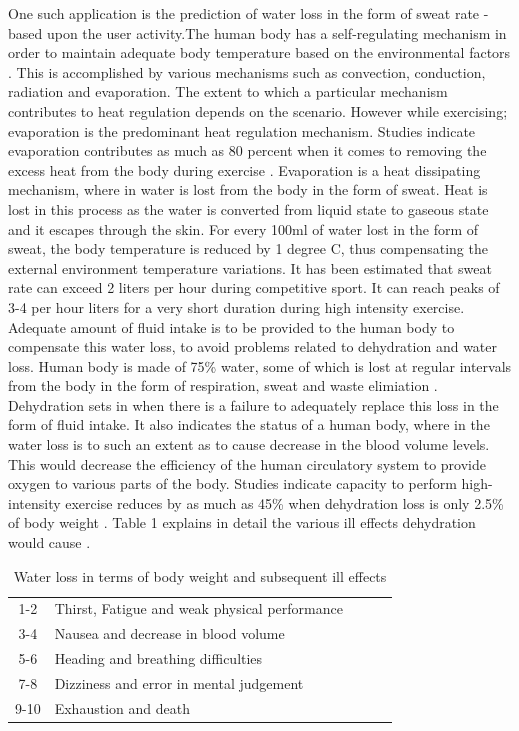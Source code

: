 \documentclass[conference]{IEEEtran}
\begin{document}
One such application is the prediction of water loss in the form of sweat rate - based upon the user activity.The human body has a self-regulating mechanism in order to maintain adequate body temperature based on the environmental factors \cite{ref8} . This is accomplished by various mechanisms such as convection, conduction, radiation and evaporation. The extent to which a particular mechanism contributes to heat regulation depends on the scenario. However while exercising; evaporation is the predominant heat regulation mechanism. Studies indicate evaporation contributes as much as 80 percent when it comes to removing the excess heat from the body during exercise \cite{ref8}. Evaporation is a heat dissipating mechanism, where in water is lost from the body in the form of sweat. Heat is lost in this process as the water is converted from liquid state to gaseous state and it escapes through the skin. For every 100ml of water lost in the form of sweat, the body temperature is reduced by 1 degree C, thus compensating the external environment temperature variations. It has been estimated that sweat rate can exceed 2 liters per hour during competitive sport. It can reach peaks of 3-4 per hour liters for a very short duration during high intensity exercise. Adequate amount of fluid intake is to be provided to the human body to compensate this water loss, to avoid problems related to dehydration and water loss. Human body is made of 75\% water, some of which is lost at regular intervals from the body in the form of respiration, sweat and waste elimiation \cite{dehydration1}. Dehydration sets in when there is a failure to adequately replace this loss in the form of fluid intake. It also indicates the status of a human body, where in the water loss is to such an extent as to cause decrease in the blood volume levels. This would decrease the efficiency of the human circulatory system to provide oxygen to various parts of the body. Studies indicate capacity to perform high-intensity exercise reduces by as much as 45\% when dehydration loss is only 2.5\% of body weight \cite{dehydration2}. Table 1 explains in detail the various ill effects dehydration would cause \cite{ref9}.


\begin{table}[htbp]
\centering
\begin{tabular}{|c|l|c|c|c|}
\hline 
\textbf{\rule{0pt}{4ex} Body weight loss \%} & \textbf{\rule{0pt}{4ex}Ill effects}\\
\hline
\rule{0pt}{4ex}1-2 & Thirst, Fatigue and weak physical performance  \\
\hline
\rule{0pt}{4ex}3-4 & Nausea and decrease in blood volume  \\
\hline
\rule{0pt}{4ex}5-6 & Heading and breathing difficulties  \\
\hline
\rule{0pt}{4ex}7-8 & Dizziness and error in mental judgement  \\
\hline
\rule{0pt}{4ex}9-10 & Exhaustion and death  \\
\hline
\end{tabular}
\bigskip
\caption{Water loss in terms of body weight and subsequent ill effects}
\par
\bigskip
\end{table}
\end{document}
